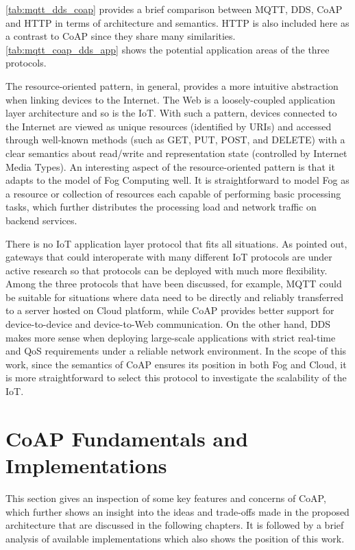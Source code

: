 \autoref{tab:mqtt_dds_coap} provides a brief comparison between MQTT, DDS, CoAP and HTTP in terms of architecture and semantics. HTTP is also included here as a contrast to CoAP since they share many similarities. \autoref{tab:mqtt_coap_dds_app} shows the potential application areas of the three protocols.

The resource-oriented pattern, in general, provides a more intuitive abstraction when linking devices to the Internet. The Web is a loosely-coupled application layer architecture \autocite{6159216} and so is the IoT. With such a pattern, devices connected to the Internet are viewed as unique resources (identified by URIs) and accessed through well-known methods (such as GET, PUT, POST, and DELETE) with a clear semantics about read/write and representation state (controlled by Internet Media Types). An interesting aspect of the resource-oriented pattern is that it adapts to the model of Fog Computing well. It is straightforward to model Fog as a resource or collection of resources each capable of performing basic processing tasks, which further distributes the processing load and network traffic on backend services. 

There is no IoT application layer protocol that fits all situations. As \textcite{7123563} pointed out, gateways that could interoperate with many different IoT protocols are under active research so that protocols can be deployed with much more flexibility. Among the three protocols that have been discussed, for example, MQTT could be suitable for situations where data need to be directly and reliably transferred to a server hosted on Cloud platform, while CoAP provides better support for device-to-device and device-to-Web communication. On the other hand, DDS makes more sense when deploying large-scale applications with strict real-time and QoS requirements under a reliable network environment. In the scope of this work, since the semantics of CoAP ensures its position in both Fog and Cloud, it is more straightforward to select this protocol to investigate the scalability of the IoT.

\section{CoAP Fundamentals and Implementations} \label{CoAP_intro}

This section gives an inspection of some key features and concerns of CoAP, which further shows an insight into the ideas and trade-offs made in the proposed architecture that are discussed in the following chapters. It is followed by a brief analysis of available implementations which also shows the position of this work. 

